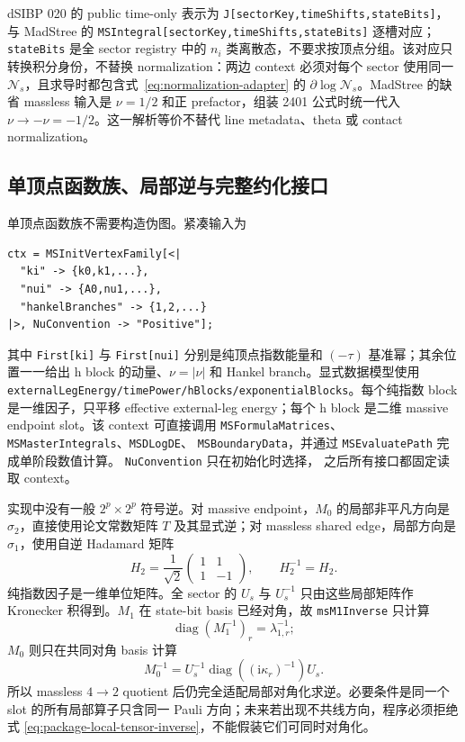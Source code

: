 \documentclass[11pt,a4paper]{ctexart}
\newcommand{\ii}{\mathrm i}
\newcommand{\cN}{\mathcal N}
\begin{document}
dSIBP 020 的 public time-only 表示为 \texttt{J[sectorKey,timeShifts,stateBits]}，与 MadStree 的 \texttt{MSIntegral[sectorKey,timeShifts,stateBits]} 逐槽对应；\texttt{stateBits} 是全 sector registry 中的 $n_i$ 类离散态，不要求按顶点分组。该对应只转换积分身份，不替换 normalization：两边 context 必须对每个 sector 使用同一 $\cN_s$，且求导时都包含式~\eqref{eq:normalization-adapter} 的 $\partial\log\cN_s$。MadStree 的缺省 massless 输入是 $\nu=1/2$ 和正 prefactor，组装 2401 公式时统一代入 $\nu\to-\nu=-1/2$。这一解析等价不替代 line metadata、theta 或 contact normalization。

\subsection{单顶点函数族、局部逆与完整约化接口}

单顶点函数族不需要构造伪图。紧凑输入为
\begin{verbatim}
ctx = MSInitVertexFamily[<|
  "ki" -> {k0,k1,...},
  "nui" -> {A0,nu1,...},
  "hankelBranches" -> {1,2,...}
|>, NuConvention -> "Positive"];
\end{verbatim}
其中 \texttt{First[ki]} 与 \texttt{First[nui]} 分别是纯顶点指数能量和 $(-\tau)$
基准幂；其余位置一一给出 h block 的动量、$\nu=|\nu|$ 和 Hankel branch。显式数据模型使用
\texttt{externalLegEnergy/}\allowbreak\texttt{timePower/}\allowbreak\texttt{hBlocks/}\allowbreak\texttt{exponentialBlocks}。每个纯指数 block 是一维因子，只平移
effective external-leg energy；每个 h block 是二维 massive endpoint slot。该 context 可直接调用
\texttt{MSFormulaMatrices}、\texttt{MSMasterIntegrals}、\texttt{MSDLogDE}、
\texttt{MSBoundaryData}，并通过 \texttt{MSEvaluatePath} 完成单阶段数值计算。
\texttt{NuConvention} 只在初始化时选择，
之后所有接口都固定读取 context。

实现中没有一般 $2^p\times2^p$ 符号逆。对 massive endpoint，$M_0$ 的局部非平凡方向是 $\sigma_2$，直接使用论文常数矩阵 $T$ 及其显式逆；对 massless shared edge，局部方向是 $\sigma_1$，使用自逆 Hadamard 矩阵
\begin{equation}
 H_2=\frac1{\sqrt2}
 \begin{pmatrix}1&1\\1&-1\end{pmatrix},
 \qquad H_2^{-1}=H_2.
 \label{eq:package-hadamard-inverse}
\end{equation}
纯指数因子是一维单位矩阵。全 sector 的 $U_s$ 与 $U_s^{-1}$ 只由这些局部矩阵作 Kronecker 积得到。$M_1$ 在 state-bit basis 已经对角，故 \texttt{msM1Inverse} 只计算
\begin{equation}
 \operatorname{diag}(M_1^{-1})_r=\lambda_{1,r}^{-1};
\end{equation}
$M_0$ 则只在共同对角 basis 计算
\begin{equation}
 M_0^{-1}=U_s^{-1}\operatorname{diag}
 \left((\ii\kappa_r)^{-1}\right)U_s.
 \label{eq:package-local-tensor-inverse}
\end{equation}
所以 massless $4\to2$ quotient 后仍完全适配局部对角化求逆。必要条件是同一个 slot 的所有局部算子只含同一 Pauli 方向；未来若出现不共线方向，程序必须拒绝式 \eqref{eq:package-local-tensor-inverse}，不能假装它们可同时对角化。
\end{document}
